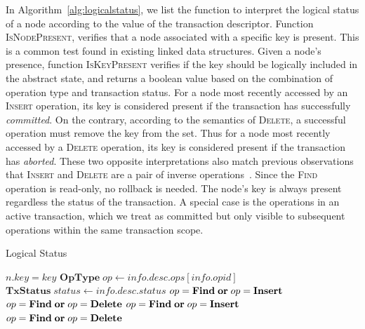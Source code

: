 \documentclass[]{sig-alternate-05-2015}
\newcommand\OR{\;\text{\textbf{or}}\;}
\newcommand\INSERT{\text{\textbf{Insert}}}
\newcommand\DELETE{\text{\textbf{Delete}}}
\newcommand\FIND{\text{\textbf{Find}}}
\newcommand\COMMITTED{\text{\textbf{Committed}}}
\newcommand\ABORTED{\text{\textbf{Aborted}}}
\newcommand\ACTIVE{\text{\textbf{Active}}}
\begin{document}
In Algorithm~\ref{alg:logicalstatus}, we list the function to interpret the logical status of a node according to the value of the transaction descriptor.
Function \textsc{IsNodePresent}, verifies that a node associated with a specific key is present.
This is a common test found in existing linked data structures.
Given a node's presence, function \textsc{IsKeyPresent} verifies if the key should be logically included in the abstract state, and returns a boolean value based on the combination of operation type and transaction status.
For a node most recently accessed by an \textsc{Insert} operation, its key is considered present if the transaction has successfully \emph{committed}.
On the contrary, according to the semantics of \textsc{Delete}, a successful operation must remove the key from the set.
Thus for a node most recently accessed by a \textsc{Delete} operation, its key is considered present if the transaction has \emph{aborted}.
These two opposite interpretations also match previous observations that \textsc{Insert} and \textsc{Delete} are a pair of inverse operations~\cite{herlihy2008transactional}.
Since the \textsc{Find} operation is read-only, no rollback is needed.
The node's key is always present regardless the status of the transaction.
A special case is the operations in an active transaction, which we treat as committed but only visible to subsequent operations within the same transaction scope.

\vspace{-8pt}
\begin{algorithm}[h]
    \caption{Logical Status}
    \label{alg:logicalstatus}
    \begin{algorithmic}[1]
        \State \Return $n.key = key$ \label{l:nodeexist}
        \EndFunction
        \State $\textbf{OpType}\;op\gets info.desc.ops[info.opid]$
        \State $\textbf{TxStatus}\;status \gets info.desc.status$ \label{l:readoldstatus}
        \Case{$\ACTIVE$}
        \State \Return $op=\FIND \OR op=\INSERT$ \label{l:casecommitted} 
        \Else
        \State \Return $op=\FIND \OR op=\DELETE$ \label{l:caseaborted} 
        \EndIf
        \EndCase
        \Case{$\COMMITTED$} 
        \State \Return $op=\FIND \OR op=\INSERT$ \label{l:casecommitted} 
        \EndCase
        \Case{$\ABORTED$}
        \State \Return $op=\FIND \OR op=\DELETE$ \label{l:caseaborted} 
        \EndCase
        \EndSwitch
        \EndFunction
    \end{algorithmic}
\end{algorithm}
\end{document}
